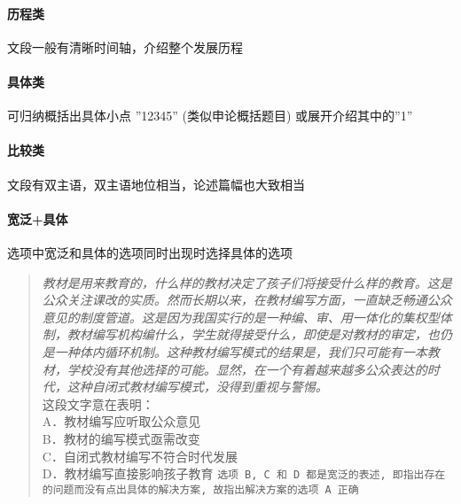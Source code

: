 \paragraph{历程类} 文段一般有清晰时间轴，介绍整个发展历程

\paragraph{具体类} 可归纳概括出具体小点 ''12345'' (类似申论概括题目) 或展开介绍其中的''1''

\paragraph{比较类} 文段有双主语，双主语地位相当，论述篇幅也大致相当

\paragraph{宽泛+具体} 选项中宽泛和具体的选项同时出现时选择具体的选项

\begin{quote}
	\begin{tcolorbox}[colback=blue!5, colframe=blue!75!black, title=宽泛+具体案例]
		\textit{教材是用来教育的，什么样的教材决定了孩子们将接受什么样的教育。这是公众关注课改的实质。然而长期以来，在教材编写方面，一直缺乏畅通公众意见的制度管道。这是因为我国实行的是一种编、审、用一体化的集权型体制，教材编写机构编什么，学生就得接受什么，即使是对教材的审定，也仍是一种体内循环机制。这种教材编写模式的结果是，我们只可能有一本教材，学校没有其他选择的可能。显然，在一个有着越来越多公众表达的时代，这种自闭式教材编写模式，没得到重视与警惕。}\\
		这段文字意在表明：\\
		A．教材编写应听取公众意见\\
		B．教材的编写模式亟需改变\\
		C．自闭式教材编写不符合时代发展\\
		D．教材编写直接影响孩子教育
		\tcblower%
		\texttt{选项 B, C 和 D 都是宽泛的表述, 即指出存在的问题而没有点出具体的解决方案, 故指出解决方案的选项 A 正确}
	\end{tcolorbox}
\end{quote}